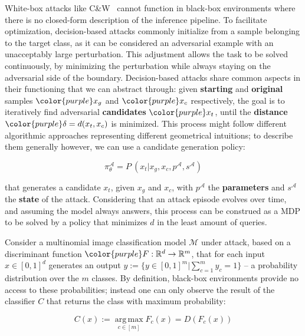 White-box attacks like C\&W~\cite{carlini2017towards} cannot function in black-box environments where there is no closed-form description of the inference pipeline.
To facilitate optimization, decision-based attacks commonly initialize from a sample belonging to the target class, as it can be considered an adversarial example with an unacceptably large perturbation.
This adjustment allows the task to be solved continuously, by minimizing the perturbation while always staying on the adversarial side of the boundary.
Decision-based attacks share common aspects in their functioning that we can abstract through: given \textbf{starting} and \textbf{original} samples $\color{purple}x_g$ and $\color{purple}x_{c}$ respectively, the goal is to iteratively find adversarial \textbf{candidates} $\color{purple}x_t$, until the \textbf{distance} $\color{purple}\delta = d(x_t, x_c)$ is minimized.
This process might follow different algorithmic approaches representing different geometrical intuitions; to describe them generally however, we can use a candidate generation policy:

\begin{equation}
    \pi_\theta^{\mathcal{A}} = P\: (x_{t}|x_g, x_{c}, p^{\mathcal{A}}, s^{\mathcal{A}})
\label{eqn:genpolicy}
\end{equation}

\noindent that generates a candidate $x_t$, given $x_g$ and $x_{c}$, with $p^{\mathcal{A}}$ the \textbf{parameters} and $s^{\mathcal{A}}$ the \textbf{state} of the attack.
Considering that an attack episode evolves over time, and assuming the model always answers, this process can be construed as a \gls{MDP} to be solved by a policy that minimizes $d$ in the least amount of queries.

Consider a multinomial image classification model $\mathcal{M}$ under attack, based on a discriminant function $\color{purple}F: \mathbb{R}^d \rightarrow \mathbb{R}^m$, that for each input $x \in [0,1]^d$ generates an output $y := \{y \in [0,1]^m |\sum_{c=1}^{m}y_c = 1\}$ -- a probability distribution over the $m$ classes.
By definition, black-box environments provide no access to these probabilities; instead one can only observe the result of the classifier $C$ that returns the class with maximum probability:

\begin{equation}
    C(x) := \operatorname*{arg\,max}_{c \in [m]} F_c(x) = D(F_c(x))
\label{eqn:classifier} 
\end{equation}


